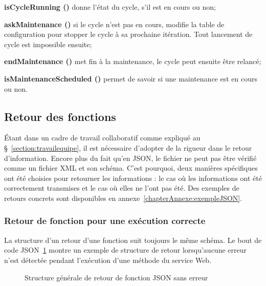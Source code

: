 \begin{longdescription}
	\item[\textbf{isCycleRunning ()}] donne l'\'etat du cycle, s'il est en cours ou non;
	\item[\textbf{askMaintenance ()}] si le cycle n'est pas en cours, modifie la table de configuration pour stopper le cycle \`a sa prochaine it\'eration.
Tout lancement de cycle est impossible ensuite;
	\item[\textbf{endMaintenance ()}] met fin \`a la maintenance, le cycle peut ensuite \^etre relanc\'e;
	\item[\textbf{isMaintenanceScheduled ()}] permet de savoir si une maintenance est en cours ou non.

\end{longdescription}

\subsection{Retour des fonctions}
\label{section:retourFonction}

\'Etant dans un cadre de travail collaboratif comme expliqu\'e au \S~\ref{section:travailequipe}, il est n\'ecessaire d'adopter de la rigueur dans le retour d'information.
Encore plus du fait qu'en JSON, le fichier ne peut pas \^etre v\'erifi\'e comme un fichier XML et son sch\'ema.
C'est pourquoi, deux mani\`eres sp\'ecifiques ont \'et\'e choisies pour retourner les informations : le cas o\`u les informations ont \'et\'e correctement transmises et le cas o\`u elles ne l'ont pas \'et\'e.
Des exemples de retours concrets sont disponibles en annexe~\ref{chapterAnnexe:exempleJSON}.

\subsubsection{Retour de fonction pour une ex\'ecution correcte}

La structure d'un retour d'une fonction suit toujours le m\^eme sch\'ema.
Le bout de code JSON~\ref{figure:structureSansErreurJSON} montre un exemple de structure de retour lorsqu'aucune erreur n'est d\'etect\'ee pendant l'ex\'ecution d'une m\'ethode du service Web.

\begin{figure}[!ht]
	\centering
	
	\caption{Structure g\'en\'erale de retour de fonction JSON sans erreur}
	\label{figure:structureSansErreurJSON}

\end{figure}

